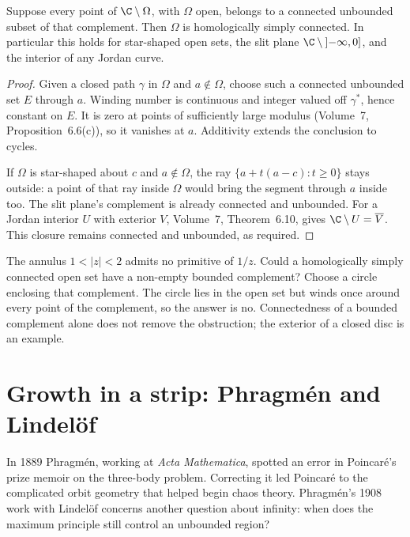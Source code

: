 \begin{proposition}\label{prop:hsccriterion}
Suppose every point of $\C\setminus\Omega$, with $\Omega$ open, belongs to a connected unbounded subset of that complement. Then $\Omega$ is homologically simply connected. In particular this holds for star-shaped open sets, the slit plane $\C\setminus\left]-\infty,0\right]$, and the interior of any Jordan curve.
\end{proposition}
\begin{proof}
Given a closed path $\gamma$ in $\Omega$ and $a\notin\Omega$, choose such a connected unbounded set $E$ through $a$. Winding number is continuous and integer valued off $\gamma^*$, hence constant on $E$. It is zero at points of sufficiently large modulus (Volume~7, Proposition~6.6(c)), so it vanishes at $a$. Additivity extends the conclusion to cycles.

If $\Omega$ is star-shaped about $c$ and $a\notin\Omega$, the ray $\{a+t(a-c):t\ge0\}$ stays outside: a point of that ray inside $\Omega$ would bring the segment through $a$ inside too. The slit plane's complement is already connected and unbounded. For a Jordan interior $U$ with exterior $V$, Volume~7, Theorem~6.10, gives $\C\setminus U=\overline V$. This closure remains connected and unbounded, as required.
\end{proof}

\begin{think}
The annulus $1<|z|<2$ admits no primitive of $1/z$. Could a homologically simply connected open set have a non-empty bounded complement? Choose a circle enclosing that complement. The circle lies in the open set but winds once around every point of the complement, so the answer is no. Connectedness of a bounded complement alone does not remove the obstruction; the exterior of a closed disc is an example.
\end{think}

\section{Growth in a strip: Phragm\'en and Lindel\"of}

In 1889 Phragm\'en, working at \emph{Acta Mathematica}, spotted an error in Poincar\'e's prize memoir on the three-body problem. Correcting it led Poincar\'e to the complicated orbit geometry that helped begin chaos theory. Phragm\'en's 1908 work with Lindel\"of concerns another question about infinity: when does the maximum principle still control an unbounded region?

